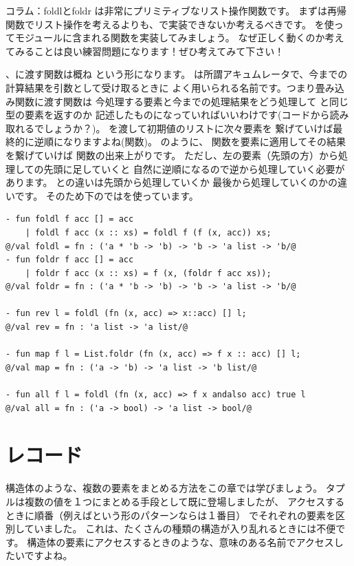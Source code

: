 \documentclass[11pt,a4paper]{jarticle}
\begin{document}
\begin{itembox}[l]{コラム：foldlとfoldr}
  は非常にプリミティブなリスト操作関数です。
  まずは再帰関数でリスト操作を考えるよりも、で実装できないか考えるべきです。
  を使ってモジュールに含まれる関数を実装してみましょう。
  なぜ正しく動くのか考えてみることは良い練習問題になります！ぜひ考えてみて下さい！

  、に渡す関数は概ね
  という形になります。
  は所謂アキュムレータで、今までの計算結果を引数として受け取るときに
  よく用いられる名前です。つまり畳み込み関数に渡す関数は
  今処理する要素と今までの処理結果をどう処理して
  と同じ型の要素を返すのか
  記述したものになっていればいいわけです(コードから読み取れるでしょうか？)。
  を渡して初期値のリストに次々要素を
  繋げていけば最終的に逆順になりますよね(関数)。
  のように、
  関数を要素に適用してその結果を繋げていけば
  関数の出来上がりです。
  ただし、左の要素（先頭の方）から処理しての先頭に足していくと
  自然に逆順になるので逆から処理していく必要があります。
  との違いは先頭から処理していくか
  最後から処理していくのかの違いです。
  そのため下のではを使っています。

\begin{lstlisting}
- fun foldl f acc [] = acc
    | foldl f acc (x :: xs) = foldl f (f (x, acc)) xs;
@/val foldl = fn : ('a * 'b -> 'b) -> 'b -> 'a list -> 'b/@
- fun foldr f acc [] = acc
    | foldr f acc (x :: xs) = f (x, (foldr f acc xs));
@/val foldr = fn : ('a * 'b -> 'b) -> 'b -> 'a list -> 'b/@

- fun rev l = foldl (fn (x, acc) => x::acc) [] l;
@/val rev = fn : 'a list -> 'a list/@

- fun map f l = List.foldr (fn (x, acc) => f x :: acc) [] l;
@/val map = fn : ('a -> 'b) -> 'a list -> 'b list/@

- fun all f l = foldl (fn (x, acc) => f x andalso acc) true l
@/val all = fn : ('a -> bool) -> 'a list -> bool/@
\end{lstlisting}
\end{itembox}

\section{レコード}
\label{sec:record}
構造体のような、複数の要素をまとめる方法をこの章では学びましょう。
タプルは複数の値を１つにまとめる手段として既に登場しましたが、
アクセスするときに順番（例えばという形のパターンならは１番目）
でそれぞれの要素を区別していました。
これは、たくさんの種類の構造が入り乱れるときには不便です。
構造体の要素にアクセスするときのような、意味のある名前でアクセスしたいですよね。
\end{document}
